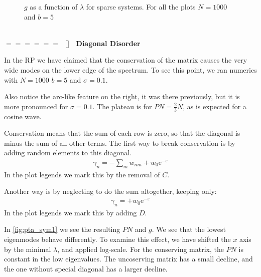 \documentclass[onecolumn,fleqn]{revtex4}
\newcommand{\eexp}{\mbox{e}^}
\newcommand{\sect}[1]
{
\addtocounter{section}{1} 
\setcounter{subsection}{0}
\ \\ 
\pdfbookmark[2]{\thesection. \ #1}{sect.\thesection}
{\Large\bf $=\!=\!=\!=\!=\!=\;$ [\thesection] \ #1}  
\nopagebreak
}
\begin{document}
\begin{figure}[H]
{  }
  \caption{$g$ as a function of $\lambda$ for sparse systems.
  For all the plots $N=1000$ and $b=5$}
\end{figure}

\sect{Diagonal Disorder}


In the RP we have claimed that the conservation of the matrix
causes the very wide modes on the lower edge of the spectrum.
To see this point, we ran numerics with $N=1000$ $b=5$ and $\sigma=0.1$.

 Also notice the arc-like feature on the right,
it was there previously, but it is more pronounced for $\sigma=0.1$.  
The plateau is for $PN=\frac{2}{3}N$, as is expected for a cosine wave. 


Conservation means that the sum of each row is zero, so that the diagonal is minus the
sum of all other terms. The first way to break conservation is by adding
random elements to this diagonal.
\begin{align}
\gamma_n = -\sum_m w_{nm} + w_0\eexp{-\varepsilon}
\end{align}
 In the plot legends we mark this by the removal of $C$.
 
 
Another way is by neglecting to do the sum altogether,
keeping only:
\begin{align}
\gamma_n = + w_0\eexp{-\varepsilon}
\end{align}
In the plot legends we mark this by adding $D$.



In \autoref{fig:pta_sym1} we see the resulting $PN$ and $g$. We see
that the lowest eigenmodes behave differently. To examine this effect,
we have shifted the $x$ axis by the minimal $\lambda$, and applied log-scale.
For the conserving matrix, the $PN$ is constant in the low eigenvalues. The
uncoserving matrix has a small decline, and the one without special diagonal 
has a larger decline. 
\end{document}
